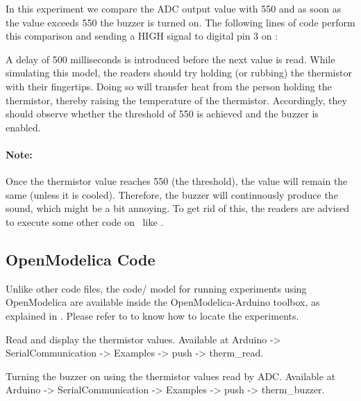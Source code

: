 \begin{enumerate}
        In this experiment we compare the ADC output value with 550
        and as soon as the value exceeds 550 the buzzer is turned on. The following lines of code perform this
        comparison and sending a {HIGH} signal to digital pin 3 on \arduino:
        
        A delay of 500 milliseconds is introduced
        before the next value is read. While simulating this model,
        the readers should try holding (or rubbing) the thermistor with their fingertips.
        Doing so will transfer heat from the person holding the
        thermistor, thereby raising the temperature of the thermistor.
        Accordingly, they should observe whether the threshold of 550 is achieved
        and the buzzer is enabled.

        \paragraph{Note:} Once the thermistor value reaches 550 (the threshold), the value will remain the same
        (unless it is cooled). Therefore, the buzzer will continuously produce the sound, which might be
        a bit annoying. To get rid of this, the readers are advised to
        execute some other code on \arduino\ like .

\end{enumerate}

\subsection{OpenModelica Code}
Unlike other code files, the code/ model for running experiments using OpenModelica are
available inside the OpenModelica-Arduino toolbox, as explained in .
Please refer to  to know how to locate the experiments.

\label{sec:therm-OpenModelica-code}

\begin{OpenModelicacode}
   {Read and display
    the thermistor values.  Available at
    Arduino -> SerialCommunication ->
    Examples -> push -> therm\_read.}
  \label{OpenModelica:therm-read}
  
\end{OpenModelicacode}

\begin{OpenModelicacode}
  {Turning the buzzer on using the thermistor values read by
    ADC.  Available at
    Arduino -> SerialCommunication ->
    Examples -> push -> therm\_buzzer.}
  \label{OpenModelica:therm-buzzer}
  
\end{OpenModelicacode}
